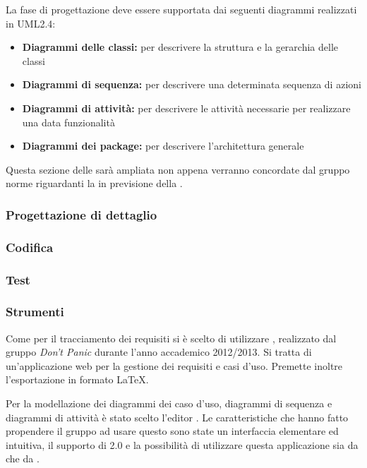 \documentclass[12pt,a4paper]{article}
\begin{document}
La fase di progettazione deve essere supportata dai seguenti diagrammi realizzati in UML2.4:
\begin{itemize}
	\item \textbf{Diagrammi delle classi:} per descrivere la struttura e la gerarchia delle classi
	\item \textbf{Diagrammi di sequenza:} per descrivere una determinata sequenza di azioni
	\item \textbf{Diagrammi di attività:} per descrivere le attività necessarie per realizzare una data funzionalità
	\item \textbf{Diagrammi dei package:} per descrivere l'architettura generale
\end{itemize}

Questa sezione delle \NdP{} sarà ampliata non appena verranno concordate dal gruppo norme riguardanti la \FPA{} in previsione della \RP.

\subsubsection{Progettazione di dettaglio}
\TODO{}

\subsubsection{Codifica}
\TODO{}

\subsubsection{Test}

\subsubsection{Strumenti}

Come  per il tracciamento dei requisiti si è scelto di utilizzare , realizzato dal gruppo \textit{Don’t Panic} durante l’anno accademico 2012/2013. Si tratta di un’applicazione web per la gestione dei requisiti e casi d’uso. Premette inoltre l’esportazione in formato \LaTeX{}.



Per la modellazione dei diagrammi dei caso d’uso, diagrammi di sequenza e diagrammi di attività è stato scelto l’editor . Le caratteristiche che hanno fatto propendere il gruppo ad usare questo  sono state un interfaccia elementare ed intuitiva, il supporto di 2.0 e la possibilità di utilizzare questa applicazione sia da  che da .
\end{document}
